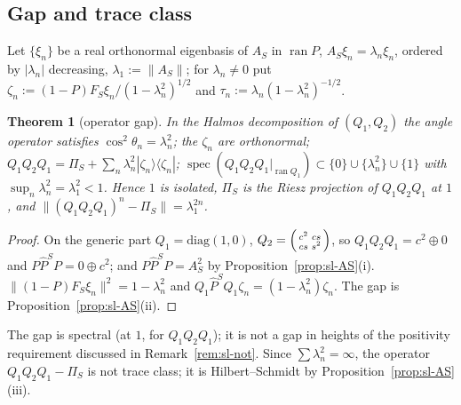 \documentclass[11pt]{amsart}
\newtheorem{theorem}{Theorem}[section]
\theoremstyle{definition}
\theoremstyle{remark}
\begin{document}
\subsection{Gap and trace class}\label{subsec:sl-trace}
Let $\{\xi_n\}$ be a real orthonormal eigenbasis of $A_S$ in $\operatorname{ran}P$, $A_S\xi_n=\lambda_n\xi_n$, ordered by
$|\lambda_n|$ decreasing, $\lambda_1:=\|A_S\|$; for $\lambda_n\ne0$ put $\zeta_n:=(1-P)F_S\xi_n/(1-\lambda_n^2)^{1/2}$ and
$\tau_n:=\lambda_n(1-\lambda_n^2)^{-1/2}$.

\begin{theorem}[operator gap]\label{thm:sl-gap}
In the Halmos decomposition of $(Q_1,Q_2)$ the angle operator satisfies $\cos^2\theta_n=\lambda_n^2$; the
$\zeta_n$ are orthonormal; $Q_1Q_2Q_1=\Pi_S+\sum_n\lambda_n^2|\zeta_n\rangle\langle\zeta_n|$;
$\operatorname{spec}(Q_1Q_2Q_1|_{\operatorname{ran}Q_1})\subset\{0\}\cup\{\lambda_n^2\}\cup\{1\}$ with
$\sup_n\lambda_n^2=\lambda_1^2<1$. Hence $1$ is isolated, $\Pi_S$ is the Riesz projection of $Q_1Q_2Q_1$ at $1$, and
$\|(Q_1Q_2Q_1)^n-\Pi_S\|=\lambda_1^{2n}$.
\end{theorem}
\begin{proof}
On the generic part $Q_1=\mathrm{diag}(1,0)$, $Q_2=\begin{psmallmatrix}c^2&cs\\cs&s^2\end{psmallmatrix}$, so
$Q_1Q_2Q_1=c^2\oplus0$ and $P\widehat P^SP=0\oplus c^2$; and $P\widehat P^SP=A_S^2$ by
Proposition~\ref{prop:sl-AS}(i). $\|(1-P)F_S\xi_n\|^2=1-\lambda_n^2$ and $Q_1\widehat P^SQ_1\zeta_n=(1-\lambda_n^2)\zeta_n$.
The gap is Proposition~\ref{prop:sl-AS}(ii).
\end{proof}
The gap is spectral (at $1$, for $Q_1Q_2Q_1$); it is not a gap in heights of the positivity
requirement discussed in Remark~\ref{rem:sl-not}. Since $\sum\lambda_n^2=\infty$, the operator
$Q_1Q_2Q_1-\Pi_S$ is not trace class; it is Hilbert--Schmidt by Proposition~\ref{prop:sl-AS}(iii).
\end{document}
